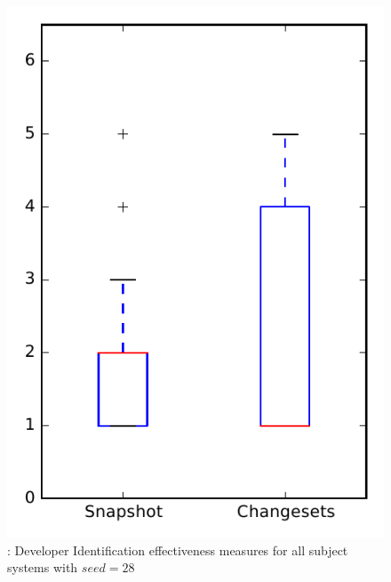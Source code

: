 
\begin{figure}
\centering
\includegraphics[height=0.4\textheight]{figures/dit_seed/rq1_overview_28}
\caption{\rtwo: Developer Identification effectiveness measures for all subject systems with $seed=28$}
\label{fig:dit_seed:rq1:overview}
\end{figure}
